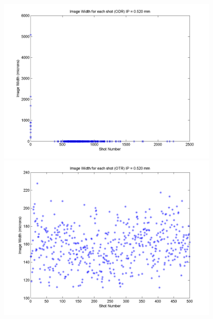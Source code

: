 \documentclass[12pt]{article}
\begin{document}
\begin{figure}
\begin{center}
\includegraphics[scale=0.5]{Figures/ImageWidth_ODR_520.PNG}
\includegraphics[scale=0.5]{Figures/ImageWidth_OTR_520.PNG}
\caption{}
\end{center}
\end{figure}
\end{document}
